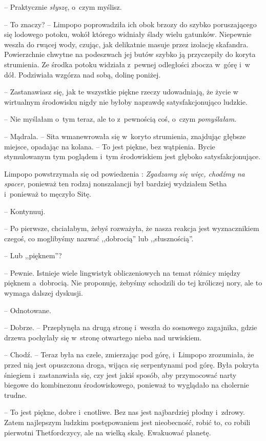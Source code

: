 \documentclass[oneside,polish,11pt,sfheadings]{mwbk}
\begin{document}
-- Praktycznie \textit{słyszę}, o~czym myślisz.

-- To znaczy? -- Limpopo poprowadziła ich obok brzozy do szybko
poruszającego się lodowego potoku, wokół którego widniały ślady wielu
gatunków. Niepewnie weszła do rwącej wody, czując, jak delikatnie masuje
przez izolację skafandra. Powierzchnie chwytne na podeszwach jej butów
szybko ją przyczepiły do koryta strumienia. Ze środka potoku widziała z~pewnej odległości zbocza w~górę i~w dół. Podziwiała wzgórza nad sobą,
dolinę poniżej.

-- Zastanawiasz się, jak te wszystkie piękne rzeczy udowadniają, że życie
w wirtualnym środowisku nigdy nie byłoby naprawdę satysfakcjonująco
ludzkie.

-- Nie myślałam o~tym teraz, ale to z~pewnością coś, o~czym
\textit{pomyślałam}.

-- Mądrala. -- Sita wmanewrowała się w~koryto strumienia, znajdując
głębsze miejsce, opadając na kolana. -- To jest piękne, bez wątpienia.
Bycie stymulowanym tym poglądem i~tym środowiskiem jest głęboko
satysfakcjonujące.

Limpopo powstrzymała się od powiedzenia : \textit{Zgadzamy się więc,
chodźmy na spacer}, ponieważ ten rodzaj nonszalancji był bardziej
wydziałem Setha i~ponieważ to męczyło Sitę.

-- Kontynuuj.

-- Po pierwsze, chciałabym, żebyś rozważyła, że nasza reakcja jest
wyznacznikiem czegoś, co moglibyśmy nazwać ,,dobrocią'' lub
,,słusznością''.

-- Lub ,,pięknem''?

-- Pewnie. Istnieje wiele lingwistyk obliczeniowych na temat różnicy
między pięknem a~dobrocią. Nie proponuję, żebyśmy schodzili do tej
króliczej nory, ale to wymaga dalszej dyskusji.

-- Odnotowane.

-- Dobrze. -- Przepłynęła na drugą stronę i~weszła do sosnowego zagajnika,
gdzie drzewa pochylały się w~stronę otwartego nieba nad urwiskiem. 

-- Chodź. -- Teraz była na czele, zmierzając pod górę, i~Limpopo zrozumiała,
że przed nią jest opuszczona droga, wijąca się serpentynami pod górę.
Była pokryta śniegiem i~zastanawiała się, czy jest jakiś sposób, aby
przymocować narty biegowe do kombinezonu środowiskowego, ponieważ to
wyglądało na cholernie trudne.

-- To jest piękne, dobre i~cnotliwe. Bez nas jest najbardziej płodny i~zdrowy. Zatem najlepszym ludzkim postępowaniem jest nieobecność, robić
to, co robili pierwotni Thetfordczycy, ale na wielką skalę. Ewakuować
planetę.
\end{document}
